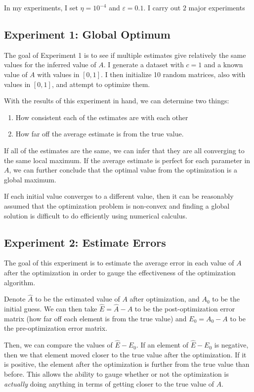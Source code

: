 \documentclass{article}
\theoremstyle{definition}
\begin{document}
In my experiments, I set $\eta = 10^{-4}$ and $\varepsilon = 0.1$. I carry out $2$ major experiments

\subsection{Experiment 1: Global Optimum}

The goal of Experiment 1 is to see if multiple estimates give relatively the same values for the inferred value of $A$. I generate a dataset with $c=1$ and a known value of $A$ with values in $[0, 1]$. I then initialize 10 random matrices, also with values in $[0, 1]$, and attempt to optimize them.

With the results of this experiment in hand, we can determine two things:

\begin{enumerate}
    \item How consistent each of the estimates are with each other
    \item How far off the average estimate is from the true value.
\end{enumerate}

If all of the estimates are the same, we can infer that they are all converging to the same local maximum. If the average estimate is perfect for each parameter in $A$, we can further conclude that the optimal value from the optimization is a global maximum.

If each initial value converges to a different value, then it can be reasonably assumed that the optimization problem is non-convex and finding a global solution is difficult to do efficiently using numerical calculus.

\subsection{Experiment 2: Estimate Errors}

The goal of this experiment is to estimate the average error in each value of $A$ after the optimization in order to gauge the effectiveness of the optimization algorithm. 

Denote $\hat{A}$ to be the estimated value of $A$ after optimization, and $A_0$ to be the initial guess. We can then take $\hat{E} = \hat{A} - A$ to be the post-optimization error matrix (how far off each element is from the true value) and $E_0 = A_0 - A$ to be the pre-optimization error matrix. 

Then, we can compare the values of $\hat{E} - E_0$. If an element of $\hat{E} - E_0$ is negative, then we that element moved closer to the true value after the optimization. If it is positive, the element after the optimization is further from the true value than before. This allows the ability to gauge whether or not the optimization is \textit{actually} doing anything in terms of getting closer to the true value of $A$.
\end{document}
